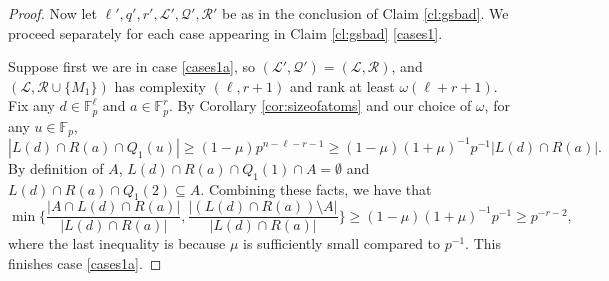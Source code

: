 \documentclass[12pt,oneside,british,a4wide]{amsart}
\numberwithin{equation}{section}
\theoremstyle{definition}
\def\F{\mathbb{F}}
\newcommand{\calL}{\mathcal{L}}
\newcommand{\calQ}{\mathcal{Q}}
\newcommand{\calR}{\mathcal{R}}
\begin{document}
\begin{proof}
Now let $\ell',q', r', \calL',\calQ',\calR'$ be as in the conclusion of Claim \ref{cl:gsbad}.  We proceed separately for each case appearing in Claim \ref{cl:gsbad} \ref{cases1}.  

Suppose first we are in case \ref{cases1a}, so  $(\calL',\calQ')=(\calL,\calR)$, and  $(\calL,\calR\cup \{M_1\})$ has complexity $(\ell, r+1)$ and rank at least $\omega(\ell+r+1)$.  Fix any $d\in \F_p^{\ell}$ and $a\in \F_p^r$. By Corollary \ref{cor:sizeofatoms} and our choice of $\omega$, for any $u\in \F_p$,
$$
|L(d)\cap R(a)\cap Q_1(u)|\geq (1-\mu)p^{n-\ell-r-1}\geq (1-\mu)(1+\mu)^{-1}p^{-1}|L(d)\cap R(a)|.
$$
By definition of $A$,  $L(d)\cap R(a)\cap Q_1(1)\cap A=\emptyset$ and $L(d)\cap R(a)\cap Q_1(2)\subseteq A$.  Combining these facts, we have that
$$
\min\Big\{\frac{|A\cap L(d)\cap R(a)|}{|L(d)\cap R(a)|},\frac{ | (L(d)\cap R(a))\setminus A|}{|L(d)\cap R(a)|}\Big\}\geq (1-\mu)(1+\mu)^{-1}p^{-1} \geq p^{-r-2},
$$
where the last inequality is because $\mu$ is sufficiently small compared to $p^{-1}$.  This finishes case \ref{cases1a}.


\end{proof}
\end{document}
